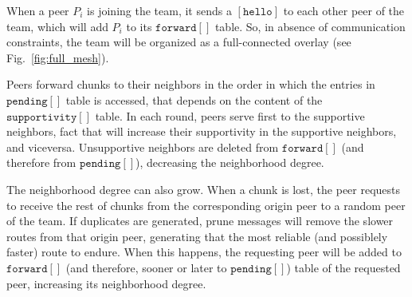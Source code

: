 When a peer $P_i$ is joining the team, it sends a $[\mathtt{hello}]$
to each other peer of the team, which will add $P_i$ to its
$\mathtt{forward}[]$ table. So, in absence of communication
constraints, the team will be organized as a full-connected overlay
(see Fig.~\ref{fig:full_mesh}).

Peers forward chunks to their neighbors in the order in which the
entries in $\mathtt{pending}[]$ table is accessed, that depends on the
content of the $\mathtt{supportivity}[]$ table. In each round, peers
serve first to the supportive neighbors, fact that will increase their
supportivity in the supportive neighbors, and viceversa. Unsupportive
neighbors are deleted from $\mathtt{forward}[]$ (and therefore from
$\mathtt{pending}[]$), decreasing the neighborhood degree.

The neighborhood degree can also grow. When a chunk is lost, the peer
requests to receive the rest of chunks from the corresponding origin
peer to a random peer of the team. If duplicates are generated, prune
messages will remove the slower routes from that origin peer,
generating that the most reliable (and possiblely faster) route to
endure. When this happens, the requesting peer will be added to
$\mathtt{forward}[]$ (and therefore, sooner or later to
$\mathtt{pending}[]$) table of the requested peer, increasing its
neighborhood degree.
